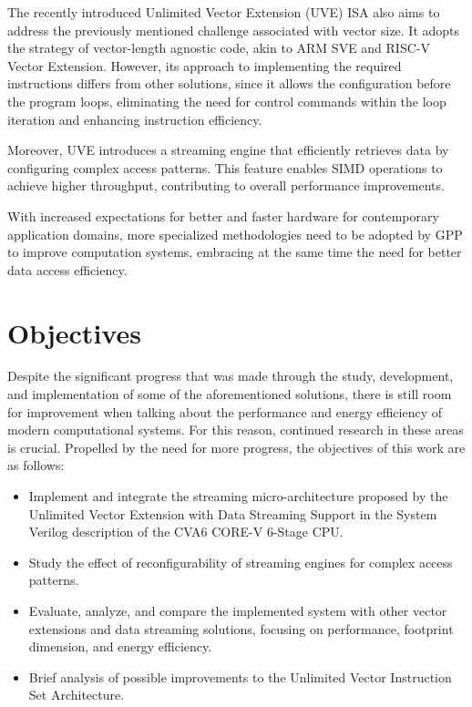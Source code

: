 The recently introduced Unlimited Vector Extension (UVE) \cite{uve-paper} \acrfull{ISA} also aims to address the previously mentioned challenge associated with vector size. It adopts the strategy of vector-length agnostic code, akin to ARM SVE and RISC-V Vector Extension. However, its approach to implementing the required instructions differs from other solutions, since it allows the configuration before the program loops, eliminating the need for control commands within the loop iteration and enhancing instruction efficiency.

Moreover, UVE introduces a streaming engine that efficiently retrieves data by configuring complex access patterns. This feature enables \acrshort{SIMD} operations to achieve higher throughput, contributing to overall performance improvements.

With increased expectations for better and faster hardware for contemporary application domains, more specialized methodologies need to be adopted by \acrfull{GPP} to improve computation systems, embracing at the same time the need for better data access efficiency.


\section{Objectives}

Despite the significant progress that was made through the study, development, and implementation of some of the aforementioned solutions, there is still room for improvement when talking about the performance and energy efficiency of modern computational systems. For this reason, continued research in these areas is crucial. 
Propelled by the need for more progress, the objectives of this work are as follows:
\begin{itemize}
    \item Implement and integrate the streaming micro-architecture proposed by the Unlimited Vector Extension with Data Streaming Support in the System Verilog description of the CVA6 CORE-V 6-Stage CPU. 
    \item Study the effect of reconfigurability of streaming engines for complex access patterns.
    \item Evaluate, analyze, and compare the implemented system with other vector extensions and data streaming solutions, focusing on performance, footprint dimension, and energy efficiency.
    \item Brief analysis of possible improvements to the Unlimited Vector Instruction Set Architecture.
\end{itemize}

